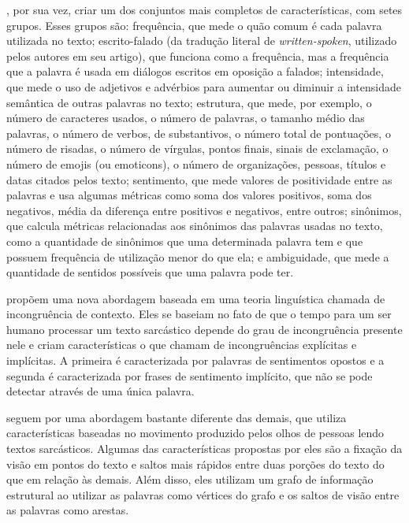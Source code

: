 \cite{barbieri:2014:modelling-sarcasm}, por sua vez, criar um dos conjuntos mais
completos de características, com setes grupos. Esses grupos são: frequência,
que mede o quão comum é cada palavra utilizada no texto; escrito-falado (da
tradução literal de \textit{written-spoken}, utilizado pelos autores em seu
artigo), que funciona como a frequência, mas a frequência que a palavra é usada
em diálogos escritos em oposição a falados; intensidade, que mede o uso de
adjetivos e advérbios para aumentar ou diminuir a intensidade semântica de
outras palavras no texto; estrutura, que mede, por exemplo, o número de
caracteres usados, o número de palavras, o tamanho médio das palavras, o número
de verbos, de substantivos, o número total de pontuações, o número de risadas, o
número de vírgulas, pontos finais, sinais de exclamação, o número de emojis (ou
emoticons), o número de organizações, pessoas, títulos e datas citados pelos
texto; sentimento, que mede valores de positividade entre as palavras e usa
algumas métricas como soma dos valores positivos, soma dos negativos, média da
diferença entre positivos e negativos, entre outros; sinônimos, que calcula
métricas relacionadas aos sinônimos das palavras usadas no texto, como a
quantidade de sinônimos que uma determinada palavra tem e que possuem frequência
de utilização menor do que ela; e ambiguidade, que mede a quantidade de sentidos
possíveis que uma palavra pode ter.

\cite{joshi:2015:context-incongruity} propõem uma nova abordagem baseada em uma
teoria linguística chamada de incongruência de contexto. Eles se baseiam no fato
de que o tempo para um ser humano processar um texto sarcástico depende do grau
de incongruência presente nele e criam características o que chamam de
incongruências explícitas e implícitas. A primeira é caracterizada por palavras
de sentimentos opostos e a segunda é caracterizada por frases de sentimento
implícito, que não se pode detectar através de uma única palavra.

\cite{mishra:2016:harnessing-cognitive} seguem por uma abordagem bastante
diferente das demais, que utiliza características baseadas no movimento
produzido pelos olhos de pessoas lendo textos sarcásticos. Algumas das
características propostas por eles são a fixação da visão em pontos do texto e
saltos mais rápidos entre duas porções do texto do que em relação às demais.
Além disso, eles utilizam um grafo de informação estrutural ao utilizar as
palavras como vértices do grafo e os saltos de visão entre as palavras como
arestas.

